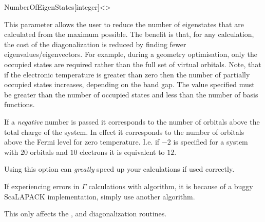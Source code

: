 \begin{fdfentry}{NumberOfEigenStates}[integer]<>

  This parameter allows the user to reduce the number of eigenstates
  that are calculated from the maximum possible. The benefit is that,
  for any calculation, the cost of the diagonalization is reduced by
  finding fewer eigenvalues/eigenvectors. For example, during a
  geometry optimisation, only the occupied states are required rather
  than the full set of virtual orbitals. Note, that if the electronic
  temperature is greater than zero then the number of partially
  occupied states increases, depending on the band gap. The value
  specified must be greater than the number of occupied states and
  less than the number of basis functions.

  If a \emph{negative} number is passed it corresponds to the number
  of orbitals above the total charge of the system. In effect it
  corresponds to the number of orbitals above the Fermi level for zero
  temperature. I.e. if $-2$ is specified for a system with $20$
  orbitals and $10$ electrons it is equivalent to $12$.

  Using this option can \emph{greatly} speed up your calculations if
  used correctly.

  \note If experiencing  errors in $\Gamma$
  calculations with  algorithm, it is because of a buggy
  ScaLAPACK implementation, simply use another algorithm.

  \note This only affects the ,  and
   diagonalization routines.
  
\end{fdfentry}


